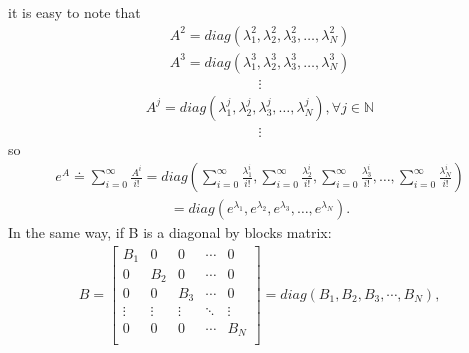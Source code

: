 \documentclass[letterpaper,10pt,english]{jupyterBook}
\begin{document}
\sphinxAtStartPar
it is easy to note that
\begin{equation*}
\begin{split}
    A^2 = diag \left(\lambda_1^2, \lambda_2^2, \lambda_3^2, \dotsc, \lambda_N^2 \right)
\end{split}
\end{equation*}\begin{equation*}
\begin{split}
    A^3 = diag \left(\lambda_1^3, \lambda_2^3, \lambda_3^3, \dotsc, \lambda_N^3 \right)
\end{split}
\end{equation*}\begin{equation*}
\begin{split}
\vdots
\end{split}
\end{equation*}\begin{equation*}
\begin{split}
    A^j = diag \left(\lambda_1^j, \lambda_2^j, \lambda_3^j, \dotsc, \lambda_N^j \right) , \forall j \in \mathbb{N}
\end{split}
\end{equation*}\begin{equation*}
\begin{split}
\vdots
\end{split}
\end{equation*}
\sphinxAtStartPar
so
\begin{equation*}
\begin{split}
    e^A \doteq \sum_{i=0}^{\infty} \frac{A^i}{i!} = diag\left(\sum_{i=0}^{\infty} \frac{\lambda_1^i}{i!}, \sum_{i=0}^{\infty} \frac{\lambda_2^i}{i!}, \sum_{i=0}^{\infty} \frac{\lambda_3^i}{i!}, \dotsc, \sum_{i=0}^{\infty} \frac{\lambda_N^i}{i!}\right)
\end{split}
\end{equation*}\begin{equation*}
\begin{split}
    = diag \left( e^{\lambda_1}, e^{\lambda_2}, e^{\lambda_3}, \dotsc, e^{\lambda_N} \right).
\end{split}
\end{equation*}
\sphinxAtStartPar
In the same way, if B is a diagonal by blocks matrix:
\begin{equation*}
\begin{split}
B =   
\left[ {\begin{array}{ccccc}
    B_1 & 0 & 0 & \dotsm & 0\\
    0 & B_2 & 0 & \dotsm & 0\\
    0 & 0 & B_3 & \dotsm & 0\\
    \vdots & \vdots & \vdots & \ddots & \vdots\\
    0 & 0 & 0 & \dotsm & B_{N}\\
\end{array} } \right] 
  = diag(B_1, B_2, B_3, \dotsm, B_N),
\end{split}
\end{equation*}
\end{document}
